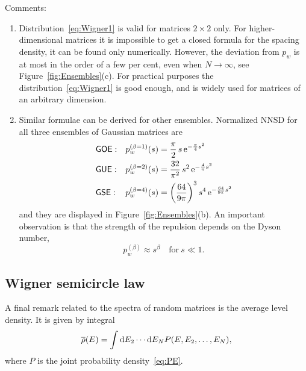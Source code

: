 \documentclass[a4paper,11pt,twoside]{article}
\begin{document}
            Comments:
            \begin{enumerate}
                \item Distribution~\eqref{eq:Wigner1} is valid for matrices $2\times2$ only.
                    For higher-dimensional matrices it is impossible to get a closed formula for the spacing density, it can be found only numerically.
                    However, the deviation from $p_{w}$ is at most in the order of a few per cent, even when $N\rightarrow\infty$, see Figure~\ref{fig:Ensembles}(c).
                    For practical purposes the distribution~\eqref{eq:Wigner1} is good enough, and is widely used for matrices of an arbitrary dimension.

                \item Similar formulae can be derived for other ensembles.
                    Normalized NNSD for all three ensembles of Gaussian matrices are
                    \begin{align}
                        &\mathsf{GOE}:
                        &p_{w}^{(\beta=1)}(s)
                            &=\frac{\pi}{2}\,s\operatorname{e}^{-\frac{\pi}{4}s^{2}}\nonumber\\
                        \label{eq:WignerAll}
                        &\mathsf{GUE}:
                        &p_{w}^{(\beta=2)}(s)
                            &=\frac{32}{\pi^{2}}\,s^{2}\operatorname{e}^{-\frac{4}{\pi}s^{2}}\\
                        &\mathsf{GSE}:
                        &p_{w}^{(\beta=4)}(s)
                            &=\left(\frac{64}{9\pi}\right)^{3}s^{4}\operatorname{e}^{-\frac{64}{9\pi}s^{2}}\nonumber
                    \end{align}
                    and they are displayed in Figure~\ref{fig:Ensembles}(b).
                    An important observation is that the strength of the repulsion depends on the Dyson number,
                    \begin{equation}
                        p_{w}^{(\beta)}\approx s^{\beta}\quad\text{for}\ s\ll1.
                    \end{equation} 
            \end{enumerate}

    \subsection{Wigner semicircle law}
        A final remark related to the spectra of random matrices is the average level density.
        It is given by integral
        \begin{equation}
            \overline{\rho}(E)=\int\mathrm{d} E_{2}\dotsb\mathrm{d} E_{N}P(E,E_{2},\dotsc,E_{N}),
        \end{equation}
        where $P$ is the joint probability density~\eqref{eq:PE}.
        
\end{document}
